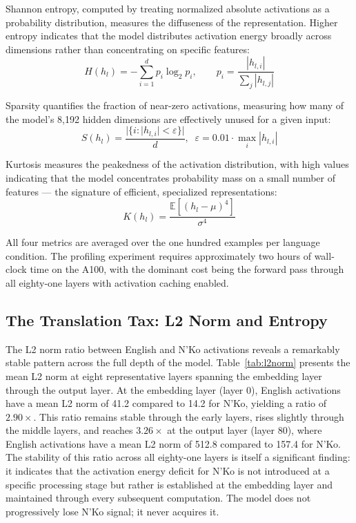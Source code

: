 \documentclass[11pt]{article}
\newcommand{\nko}{N'Ko}
\begin{document}
Shannon entropy, computed by treating normalized absolute activations as a probability distribution, measures the diffuseness of the representation. Higher entropy indicates that the model distributes activation energy broadly across dimensions rather than concentrating on specific features:
\begin{equation}
H(h_l) = -\sum_{i=1}^{d} p_i \log_2 p_i, \qquad p_i = \frac{|h_{l,i}|}{\sum_j |h_{l,j}|}
\label{eq:entropy}
\end{equation}

Sparsity quantifies the fraction of near-zero activations, measuring how many of the model's 8,192 hidden dimensions are effectively unused for a given input:
\begin{equation}
S(h_l) = \frac{|\{i : |h_{l,i}| < \varepsilon\}|}{d},\;\; \varepsilon = 0.01 \cdot \max_i |h_{l,i}|
\label{eq:sparsity}
\end{equation}

Kurtosis measures the peakedness of the activation distribution, with high values indicating that the model concentrates probability mass on a small number of features --- the signature of efficient, specialized representations:
\begin{equation}
K(h_l) = \frac{\mathbb{E}\left[(h_l - \mu)^4\right]}{\sigma^4}
\label{eq:kurtosis}
\end{equation}

All four metrics are averaged over the one hundred examples per language condition. The profiling experiment requires approximately two hours of wall-clock time on the A100, with the dominant cost being the forward pass through all eighty-one layers with activation caching enabled.

\subsection{The Translation Tax: L2 Norm and Entropy}
\label{sec:translation_tax}

The L2 norm ratio between English and \nko{} activations reveals a remarkably stable pattern across the full depth of the model. Table~\ref{tab:l2norm} presents the mean L2 norm at eight representative layers spanning the embedding layer through the output layer. At the embedding layer (layer 0), English activations have a mean L2 norm of 41.2 compared to 14.2 for \nko{}, yielding a ratio of $2.90\times$. This ratio remains stable through the early layers, rises slightly through the middle layers, and reaches $3.26\times$ at the output layer (layer 80), where English activations have a mean L2 norm of 512.8 compared to 157.4 for \nko{}. The stability of this ratio across all eighty-one layers is itself a significant finding: it indicates that the activation energy deficit for \nko{} is not introduced at a specific processing stage but rather is established at the embedding layer and maintained through every subsequent computation. The model does not progressively lose \nko{} signal; it never acquires it.
\end{document}
